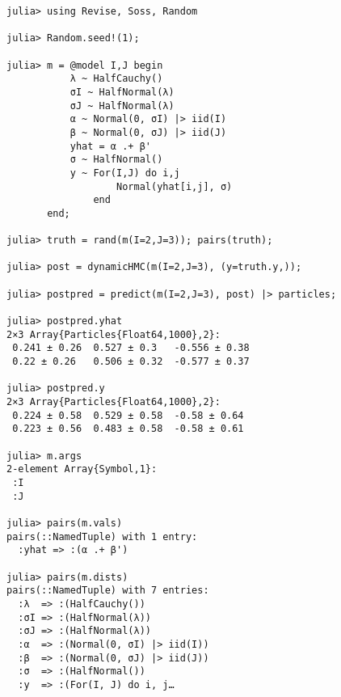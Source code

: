 \documentclass[anonymous=false, %
               format=acmsmall, %
               review=true, %
               screen=true, %
               nonacm=true]{acmart}
\begin{document}
\begin{verbatim}
julia> using Revise, Soss, Random

julia> Random.seed!(1);

julia> m = @model I,J begin
           λ ~ HalfCauchy()
           σI ~ HalfNormal(λ)
           σJ ~ HalfNormal(λ)
           α ~ Normal(0, σI) |> iid(I)
           β ~ Normal(0, σJ) |> iid(J)
           yhat = α .+ β'
           σ ~ HalfNormal()
           y ~ For(I,J) do i,j 
                   Normal(yhat[i,j], σ)
               end
       end;

julia> truth = rand(m(I=2,J=3)); pairs(truth);

julia> post = dynamicHMC(m(I=2,J=3), (y=truth.y,));

julia> postpred = predict(m(I=2,J=3), post) |> particles;

julia> postpred.yhat
2×3 Array{Particles{Float64,1000},2}:
 0.241 ± 0.26  0.527 ± 0.3   -0.556 ± 0.38
 0.22 ± 0.26   0.506 ± 0.32  -0.577 ± 0.37

julia> postpred.y
2×3 Array{Particles{Float64,1000},2}:
 0.224 ± 0.58  0.529 ± 0.58  -0.58 ± 0.64
 0.223 ± 0.56  0.483 ± 0.58  -0.58 ± 0.61

julia> m.args
2-element Array{Symbol,1}:
 :I
 :J

julia> pairs(m.vals)
pairs(::NamedTuple) with 1 entry:
  :yhat => :(α .+ β')

julia> pairs(m.dists)
pairs(::NamedTuple) with 7 entries:
  :λ  => :(HalfCauchy())
  :σI => :(HalfNormal(λ))
  :σJ => :(HalfNormal(λ))
  :α  => :(Normal(0, σI) |> iid(I))
  :β  => :(Normal(0, σJ) |> iid(J))
  :σ  => :(HalfNormal())
  :y  => :(For(I, J) do i, j…

\end{verbatim}
\end{document}
